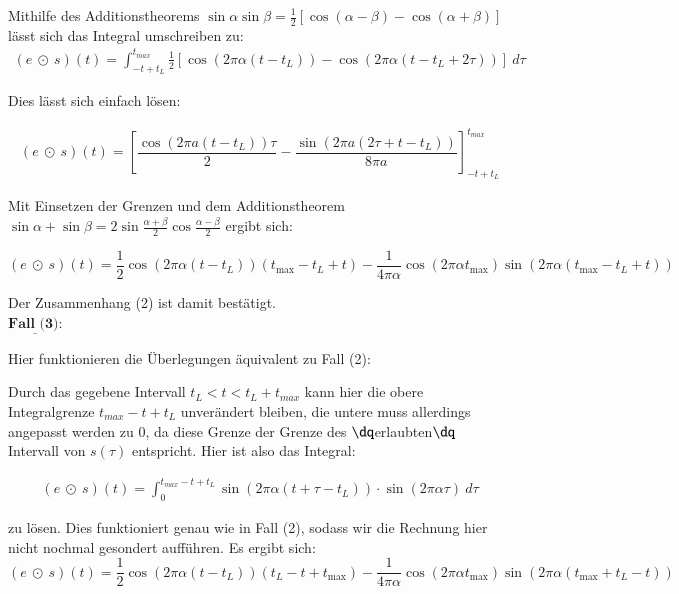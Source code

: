 \documentclass[ngerman]{scrartcl}
\begin{document}
Mithilfe des Additionstheorems $\sin \alpha \sin \beta = \frac{1}{2} \left[ \cos(\alpha-\beta) - \cos (\alpha+\beta) \right]$ lässt sich das Integral umschreiben zu:
\begin{align*}
(e ~\odot~ s)(t)=\int_{-t+t_L}^{t_{max}} \frac{1}{2} \left[ \cos(2 \pi \alpha (t-t_L)) - \cos (2\pi \alpha(t-t_L+2 \tau)) \right] ~ d \tau
\end{align*}

Dies lässt sich einfach lösen:

\begin{align*}
(e ~\odot~ s)(t)=\left[ \dfrac{\cos\left(2{\pi}a\left(t-t_L\right)\right)\tau}{2}-\dfrac{\sin\left(2{\pi}a\left(2\tau+t-t_L\right)\right)}{8{\pi}a} \right]_{-t+t_L}^{t_{max}}
\end{align*}

Mit Einsetzen der Grenzen und dem Additionstheorem $\sin \alpha +\sin \beta = 2 \sin \frac{\alpha + \beta}{2} \cos \frac{\alpha - \beta}{2}$ ergibt sich:

\begin{equation*}
	(e ~\odot~ s)(t)=\frac{1}{2} \cos \left(2 \pi \alpha\left(t-t_{L}\right)\right)\left(t_{\max }-t_{L}+t\right) -\frac{1}{4 \pi \alpha} \cos \left(2 \pi \alpha t_{\max }\right) \sin \left(2 \pi \alpha\left(t_{\max }-t_{L}+t\right)\right)
\end{equation*}

Der Zusammenhang (2) ist damit bestätigt.\\


$\underline{\textbf{Fall (3):}}$

Hier funktionieren die Überlegungen äquivalent zu Fall (2):

Durch das gegebene Intervall $t_L < t < t_L + t_{max}$ kann hier die obere Integralgrenze $t_{max}-t+t_L$ unverändert bleiben, die untere muss allerdings angepasst werden zu 0, da diese Grenze der Grenze des $\dq$erlaubten$\dq$~ Intervall von $s(\tau)$ entspricht. Hier ist also das Integral:

\begin{align*}
(e ~\odot~ s)(t)=\int_{0}^{t_{max}-t+t_L} \sin (2 \pi \alpha (t+\tau-t_L)) \cdot \sin (2 \pi \alpha \tau)~ d \tau
\end{align*}

zu lösen. Dies funktioniert genau wie in Fall (2), sodass wir die Rechnung hier nicht nochmal gesondert aufführen. Es ergibt sich:
\begin{equation*}
	(e ~\odot~ s)(t)= \frac{1}{2} \cos \left(2 \pi \alpha\left(t-t_{L}\right)\right)\left(t_{L}-t+t_{\max }\right) -\frac{1}{4 \pi \alpha} \cos \left(2 \pi \alpha t_{\max }\right) \sin \left(2 \pi \alpha\left(t_{\max }+t_{L}-t\right)\right)
\end{equation*}
\end{document}
